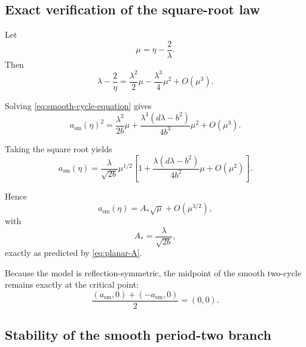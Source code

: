 \subsection{Exact verification of the square-root law}
\label{subsec:planar-square-root}

Let
\begin{equation}
\mu
=
\eta-\frac{2}{\lambda}.
\label{eq:planar-mu}
\end{equation}
Then
\begin{equation}
\lambda-\frac{2}{\eta}
=
\frac{\lambda^2}{2}\mu
-
\frac{\lambda^3}{4}\mu^2
+
O(\mu^3).
\label{eq:lambda-two-over-eta-expansion}
\end{equation}

Solving \eqref{eq:smooth-cycle-equation} gives
\begin{equation}
a_{\mathrm{sm}}(\eta)^2
=
\frac{\lambda^2}{2b}\mu
+
\frac{
\lambda^3(d\lambda-b^2)
}{
4b^3
}
\mu^2
+
O(\mu^3).
\label{eq:a-square-expansion}
\end{equation}

Taking the square root yields
\begin{equation}
a_{\mathrm{sm}}(\eta)
=
\frac{\lambda}{\sqrt{2b}}
\mu^{1/2}
\left[
1
+
\frac{
\lambda(d\lambda-b^2)
}{
4b^2
}
\mu
+
O(\mu^2)
\right].
\label{eq:a-expansion}
\end{equation}

Hence
\begin{equation}
a_{\mathrm{sm}}(\eta)
=
A_*\sqrt{\mu}
+
O(\mu^{3/2}),
\label{eq:planar-square-root-law}
\end{equation}
with
\[
A_*=\frac{\lambda}{\sqrt{2b}},
\]
exactly as predicted by
\eqref{eq:planar-A}.

Because the model is reflection-symmetric, the midpoint of the
smooth two-cycle remains exactly at the critical point:
\begin{equation}
\frac{
(a_{\mathrm{sm}},0)
+
(-a_{\mathrm{sm}},0)
}{2}
=
(0,0).
\label{eq:planar-midpoint-zero}
\end{equation}

\subsection{Stability of the smooth period-two branch}
\label{subsec:planar-smooth-stability}

